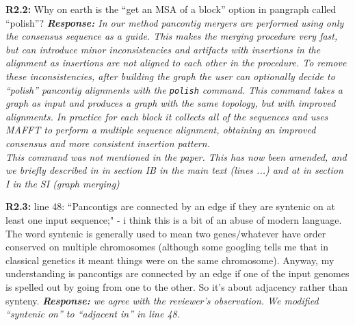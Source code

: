 \documentclass[aps,rmp,onecolumn]{revtex4-1}
\newcommand{\Marco}[1]{{\color{orange}Marco: #1}}
\newcommand{\Liam}[1]{{\color{teal}Liam: #1}}
\newcommand{\reviewer}[2]{\textbf{#1:} #2\vskip 5mm}
\newcommand{\response}[1]{{\it {\color{response}\textbf{Response:} #1}}\vskip 5mm}
\begin{document}
\reviewer{R2.2}{Why on earth is the ``get an MSA of a block'' option in pangraph called ``polish''?}
\response{In our method pancontig mergers are performed using only the consensus sequence as a guide. This makes the merging procedure very fast, but can introduce minor inconsistencies and artifacts with insertions in the alignment as insertions are not aligned to each other in the procedure.
      To remove these inconsistencies, after building the graph the user can optionally decide to ``polish'' pancontig alignments with the \texttt{polish} command. This command takes a graph as input and produces a graph with the same topology, but with improved alignments. In practice for each block it collects all of the sequences and uses MAFFT \cite{katoh2002mafft} to perform a multiple sequence alignment, obtaining an improved consensus and more consistent insertion pattern.\\
      This command was not mentioned in the paper. This has now been amended, and we briefly described in in section IB in the main text (lines ...) and at in section I in the SI (graph merging) }

\reviewer{R2.3}{line 48: ``Pancontigs are connected by an edge if they are syntenic on at least one input sequence;" - i think this is a bit of an abuse of modern language. The word syntenic is generally used to mean two genes/whatever have order conserved on multiple chromosomes (although some googling tells me that in classical genetics it meant things were on the same chromosome). Anyway, my understanding is pancontigs are connected by an edge if one of the input genomes is spelled out by going from one to the other. So it's about adjacency rather than synteny.}
\response{we agree with the reviewer's observation. We modified ``syntenic on'' to ``adjacent in'' in line 48.}
\end{document}
